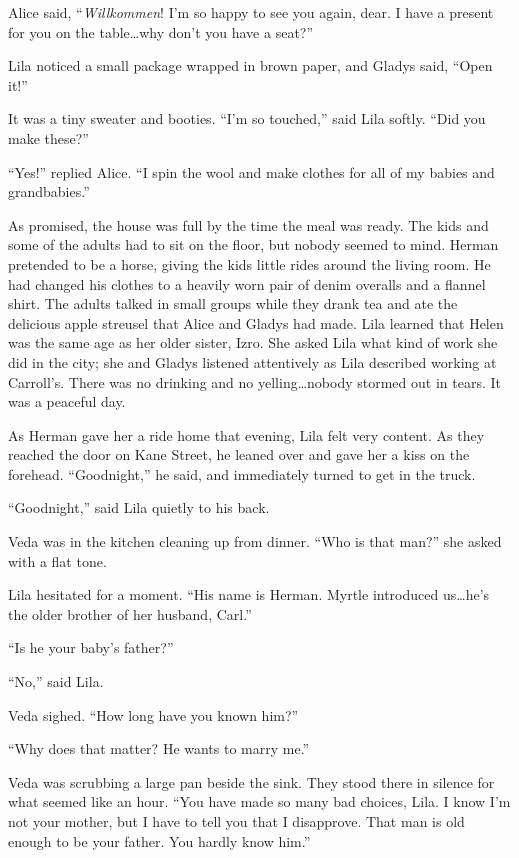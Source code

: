 \documentclass[
  american,
  letterpaper,
]{book}
\begin{document}
Alice said, ``\emph{Willkommen}! I'm so happy to see you again, dear. I
have a present for you on the table\ldots why don't you have a seat?''

Lila noticed a small package wrapped in brown paper, and Gladys said,
``Open it!''

It was a tiny sweater and booties. ``I'm so touched,'' said Lila softly.
``Did you make these?''

``Yes!'' replied Alice. ``I spin the wool and make clothes for all of my
babies and grandbabies.''

As promised, the house was full by the time the meal was ready. The kids
and some of the adults had to sit on the floor, but nobody seemed to
mind. Herman pretended to be a horse, giving the kids little rides
around the living room. He had changed his clothes to a heavily worn
pair of denim overalls and a flannel shirt. The adults talked in small
groups while they drank tea and ate the delicious apple streusel that
Alice and Gladys had made. Lila learned that Helen was the same age as
her older sister, Izro. She asked Lila what kind of work she did in the
city; she and Gladys listened attentively as Lila described working at
Carroll's. There was no drinking and no yelling\ldots nobody stormed out
in tears. It was a peaceful day.

As Herman gave her a ride home that evening, Lila felt very content. As
they reached the door on Kane Street, he leaned over and gave her a kiss
on the forehead. ``Goodnight,'' he said, and immediately turned to get
in the truck.

``Goodnight,'' said Lila quietly to his back.

Veda was in the kitchen cleaning up from dinner. ``Who is that man?''
she asked with a flat tone.

Lila hesitated for a moment. ``His name is Herman. Myrtle introduced
us\ldots he's the older brother of her husband, Carl.''

``Is he your baby's father?''

``No,'' said Lila.

Veda sighed. ``How long have you known him?''

``Why does that matter? He wants to marry me.''

Veda was scrubbing a large pan beside the sink. They stood there in
silence for what seemed like an hour. ``You have made so many bad
choices, Lila. I know I'm not your mother, but I have to tell you that I
disapprove. That man is old enough to be your father. You hardly know
him.''
\end{document}
